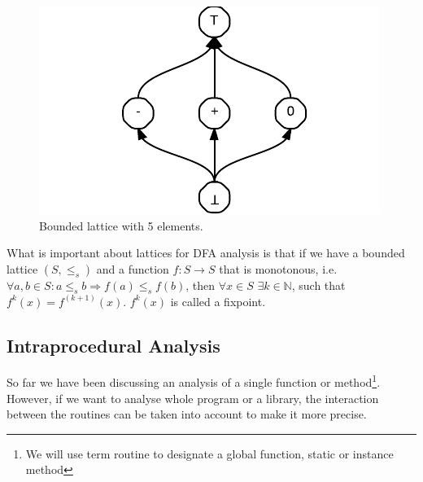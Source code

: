 \begin{figure}[h]  
  \centering
    \includegraphics{img/lattice.pdf}
  \caption{Bounded lattice with 5 elements.\label{lattice}}    
\end{figure}

        What is important about lattices for 
        DFA analysis is that if we have a 
        bounded lattice $(S, \leq_{s})$ and a function 
        $f:S\rightarrow{S}$ that is monotonous, 
        i.e. $\forall{a,b\in{S}}: a\leq_s{b} \Rightarrow f(a)\leq_s{f(b)}$, 
        then $\forall{x\in{S}}$ $\exists{k\in\mathbb{N}}$, such that 
        $f^k(x)=f^{(k+1)}(x)$. $f^k(x)$ is called a fixpoint.
        
        
        
        \paragraph*{}

        \subsection{Intraprocedural Analysis}
        So far we have been discussing an analysis of a 
        single function or method\footnote{We will use term 
        routine to designate a global function, static or instance method}. 
        However, if we want to analyse whole program or 
        a library, the interaction between the routines 
        can be taken into account to make it more precise.
        
